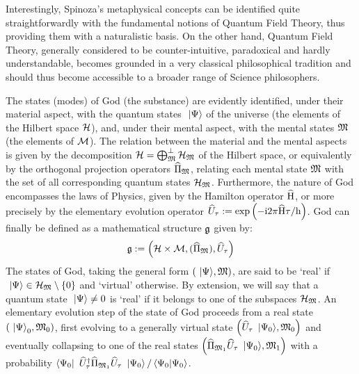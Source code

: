 Interestingly, Spinoza's metaphysical concepts can be identified quite straightforwardly with the fundamental notions of Quantum Field Theory, thus providing them with a naturalistic basis.
On the other hand, Quantum Field Theory, generally considered to be counter-intuitive, paradoxical and hardly understandable, becomes grounded in a very classical philosophical tradition and should thus become accessible to a broader range of Science philosophers.

The states (modes) of God (the substance) are evidently identified, under their material aspect, with the quantum states $\ \left|{\Psi}\right\rangle$ of the universe (the elements of the Hilbert space $\mathcal H$), and, under their mental aspect, with the mental states $\mathfrak{M}$ (the elements of $\mathcal M$).
The relation between the material and the mental aspects is given by the decomposition $\mathcal H = \bigoplus_{\mathfrak{M}}^\perp \mathcal H_{\mathfrak{M}}$ of the Hilbert space, or equivalently by the orthogonal projection operators $\widehat{\Pi}_{\mathfrak{M}}$, relating each mental state $\mathfrak{M}$ with the set of all corresponding quantum states $\mathcal H_{\mathfrak{M}}$.
Furthermore, the nature of God encompasses the laws of Physics, given by the Hamilton operator $\widehat{\mathrm H}$, or more precisely by the elementary evolution operator $\widehat{U}_\tau := \mathrm{exp} \left( {- \mathrm{i} 2 \pi \widehat{\mathrm H} \tau / \mathrm h} \right)$.
God can finally be defined as a mathematical structure $\mathfrak{g}$ given by:
\begin{equation*}
\mathfrak{g} := \left( \mathcal H \times \mathcal M, (\widehat{\Pi}_{\mathfrak{M}}), \widehat{U}_\tau \right)
\end{equation*}
The states of God, taking the general form $\left({\ \left|{\Psi}\right\rangle},{\mathfrak{M}}\right)$, are said to be `real' if $\ \left|{\Psi}\right\rangle \in \mathcal H_{\mathfrak{M}} \setminus \{ 0 \}$ and `virtual' otherwise.
By extension, we will say that a quantum state $\ \left|{\Psi}\right\rangle \neq 0$ is `real' if it belongs to one of the subspaces $\mathcal H_{\mathfrak{M}}$.
An elementary evolution step of the state of God proceeds from a real state $\left({\ \left|{\Psi}\right\rangle_0},{\mathfrak{M}_0}\right)$, first evolving to a generally virtual state $\left({\widehat{U}_\tau \ \left|{\Psi_0}\right\rangle},{\mathfrak{M}_0}\right)$ and eventually collapsing to one of the real states $\left({\widehat{\Pi}_{\mathfrak{M}_1} \widehat{U}_\tau \ \left|{\Psi_0}\right\rangle},{\mathfrak{M}_1}\right)$ with a probability $\left\langle{\Psi_0}\right|\  \widehat{U}^{\dagger}_\tau \widehat{\Pi}_{\mathfrak{M}_1} \widehat{U}_\tau \ \left|{\Psi_0}\right\rangle / \left\langle{\Psi_0}|{\Psi_0}\right\rangle$.
